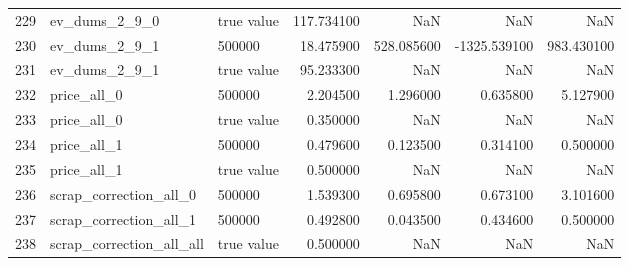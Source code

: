 \begin{tabular}{lllrrrr}
229 & ev_dums_2_9_0 & true value & 117.734100 & NaN & NaN & NaN \\
230 & ev_dums_2_9_1 & 500000 & 18.475900 & 528.085600 & -1325.539100 & 983.430100 \\
231 & ev_dums_2_9_1 & true value & 95.233300 & NaN & NaN & NaN \\
232 & price_all_0 & 500000 & 2.204500 & 1.296000 & 0.635800 & 5.127900 \\
233 & price_all_0 & true value & 0.350000 & NaN & NaN & NaN \\
234 & price_all_1 & 500000 & 0.479600 & 0.123500 & 0.314100 & 0.500000 \\
235 & price_all_1 & true value & 0.500000 & NaN & NaN & NaN \\
236 & scrap_correction_all_0 & 500000 & 1.539300 & 0.695800 & 0.673100 & 3.101600 \\
237 & scrap_correction_all_1 & 500000 & 0.492800 & 0.043500 & 0.434600 & 0.500000 \\
238 & scrap_correction_all_all & true value & 0.500000 & NaN & NaN & NaN \\
\bottomrule
\end{tabular}
